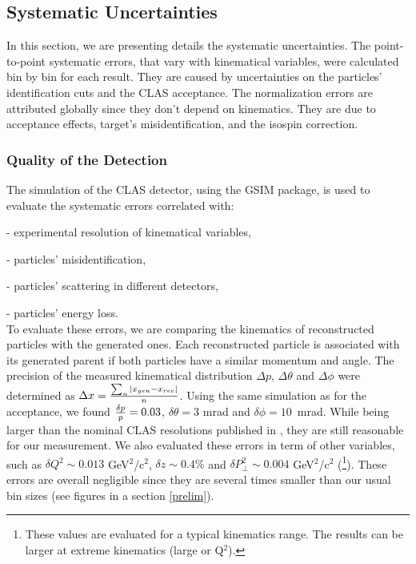 \subsection{Systematic Uncertainties}
\label{sec:TotSys}

In this section, we are presenting details the systematic uncertainties. The 
point-to-point systematic errors, that vary with kinematical variables, were 
calculated bin by bin for each result. They are caused by uncertainties on the 
particles' identification cuts and the CLAS acceptance. The normalization 
errors are attributed globally since they don't depend on kinematics. They 
are due to acceptance effects, target's misidentification, and the isospin 
correction.

\subsubsection{Quality of the Detection}
\label{SysId}

The simulation of the CLAS detector, using the GSIM package, is used 
to evaluate the systematic errors correlated with:

  - experimental resolution of kinematical variables,

  - particles' misidentification,

  - particles' scattering in different detectors,

  - particles' energy loss.\\


To evaluate these errors, we are comparing the kinematics of reconstructed 
particles with the generated ones. Each reconstructed particle is associated 
with its generated parent if both particles have a similar momentum and 
angle. The precision of the measured kinematical distribution 
$\Delta p$, $\Delta \theta$ and $\Delta \phi$ were determined as $\Delta x = 
{\sum_n |x_{gen} - x_{rec}| \over n}$. Using the same simulation as for 
the acceptance, we found 
${\delta p \over p } = 0.03$, $\delta \theta = 3$ mrad and $\delta \phi = 
10$~mrad. While being larger than the nominal CLAS resolutions published in 
\cite{Mecking:2003zu}, they are still reasonable for our measurement. We also 
evaluated these errors in term of other variables, such as 
$\delta Q^2 \sim 0.013$ GeV$^2$/c$^2$, $\delta z \sim 0.4 \%$ and $\delta 
P_\perp^2 \sim 0.004$ GeV$^2$/c$^2$ (\footnote{These values are evaluated for 
a typical kinematics range. The results can be larger at extreme kinematics 
(large \pt or Q$^2$).}). These errors are overall negligible since they are 
several times smaller than our usual bin sizes (see figures in a section 
\ref{prelim}). 

